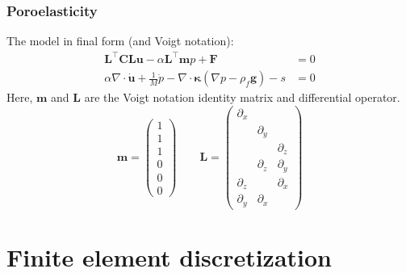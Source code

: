 \documentclass{beamer}
\begin{document}
\begin{frame}
  \frametitle{Poroelasticity}

  The model in final form (and Voigt notation):
  \begin{align*}
    \bm{L}^\intercal \bm{CLu} - \alpha \bm{L}^\intercal \bm{m} p + \bm{F} &= 0 \\
    \alpha \nabla \cdot \dot{\bm{u}} + \frac{1}{M}\dot{p}
    - \nabla \cdot \bm{\kappa}(\nabla p - \rho_f\bm{g}) - s &= 0
  \end{align*}
  Here, $\bm{m}$ and $\bm{L}$ are the Voigt notation identity matrix and
  differential operator.
  \[
    \bm{m} = \begin{pmatrix} 1 \\ 1 \\ 1 \\ 0 \\ 0 \\ 0 \end{pmatrix} \qquad
    \bm{L} = \begin{pmatrix}
      \partial_x & & \\
      & \partial_y & \\
      & & \partial_z \\
      & \partial_z & \partial_y \\
      \partial_z & & \partial_x \\
      \partial_y & \partial_x &
    \end{pmatrix}
  \]
\end{frame}

\section{Finite element discretization}
\end{document}
